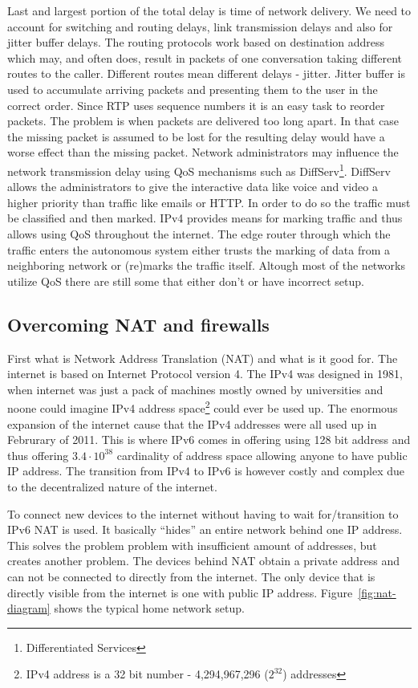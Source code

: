 Last and largest portion of the total delay is time of network delivery. We need to account for switching and routing delays, link transmission delays and also for jitter buffer delays. The routing protocols work based on destination address which may, and often does, result in packets of one conversation taking different routes to the caller. Different routes mean different delays - jitter. Jitter buffer is used to accumulate arriving packets and presenting them to the user in the correct order. Since RTP uses sequence numbers it is an easy task to reorder packets. The problem is when packets are delivered too long apart. In that case the missing packet is assumed to be lost for the resulting delay would have a worse effect than the missing packet. Network administrators may influence the network transmission delay using QoS mechanisms such as DiffServ\footnote{Differentiated Services}. DiffServ allows the administrators to give the interactive data like voice and video a higher priority than traffic like emails or HTTP. In order to do so the traffic must be classified and then marked. IPv4 provides means for marking traffic and thus allows using QoS throughout the internet. The edge router through which the traffic enters the autonomous system either trusts the marking of data from a neighboring network or (re)marks the traffic itself. Altough most of the networks utilize QoS there are still some that either don't or have incorrect setup.  

\subsection*{Overcoming NAT and firewalls}
First what is Network Address Translation (NAT) and what is it good for. The internet is based on Internet Protocol version 4. The IPv4 was designed in 1981, when internet was just a pack of machines mostly owned by universities and noone could imagine IPv4 address space\footnote{IPv4 address is a 32 bit number - 4,294,967,296 ($2^{32}$) addresses} could ever be used up. The enormous expansion of the internet cause that the IPv4 addresses were all used up in Februrary of 2011\cite{ianaAddressSpaceReport}. This is where IPv6 comes in offering using 128 bit address and thus offering $3.4\cdot10^{38}$ cardinality of address space allowing anyone to have public IP address. The transition from IPv4 to IPv6 is however costly and complex due to the decentralized nature of the internet.  

To connect new devices to the internet without having to wait for/transition to IPv6 NAT is used. It basically ``hides'' an entire network behind one IP address. This solves the problem problem with insufficient amount of addresses, but creates another problem. The devices behind NAT obtain a private address and can not be connected to directly from the internet. The only device that is directly visible from the internet is one with public IP address. Figure~\ref{fig:nat-diagram} shows the typical home network setup. 

